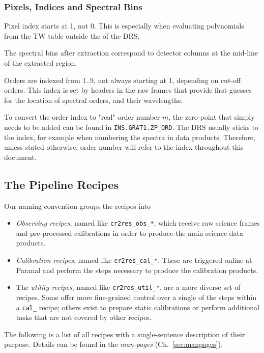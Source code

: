 \subsubsection{Pixels, Indices and Spectral Bins}
Pixel index starts at 1, not 0. This is especially when evaluating polynomials
from the TW table outside the of the DRS.

The spectral bins after extraction correspond to detector columns at the
mid-line of the extracted region.

Orders are indexed from 1..9, not always starting at 1, depending on cut-off
orders. This index is set by headers in the raw frames that provide first-guesses
for the location of spectral orders, and their wavelengths.

To convert the order index to "real" order number $m$, the zero-point that
simply needs to be added can be found in \texttt{INS.GRAT1.ZP_ORD}. The DRS
usually sticks to the index, for example when numbering the spectra in data
products. Therefore, unless stated otherwise, order number will refer to the
index throughout this document.

\subsection{The Pipeline Recipes}
\label{sec:recipes-quick}

Our naming convention groups the recipes into
\begin{itemize}
    \item \textit{Observing recipes}, named like \texttt{cr2res\_obs\_*}, which
    receive raw science frames and pre-processed calibrations in order to
    produce the main science data products.
    \item \textit{Calibration recipes}, named like \texttt{cr2res\_cal\_*}. These are triggered online at Paranal and perform the steps necessary to produce the calibration products.
    \item The \textit{utility recipes}, named like \texttt{cr2res\_util\_*}, are a more diverse set of recipes. Some offer more fine-grained control over a single of the steps within a \texttt{cal\_} recipe; others exist to prepare static calibrations or perform additional tasks that are not covered by other recipes.
\end{itemize}

The following is a list of all recipes with a single-sentence description of their purpose. Details can be found in the \emph{man-pages} (Ch.~\ref{sec:manpages}).

